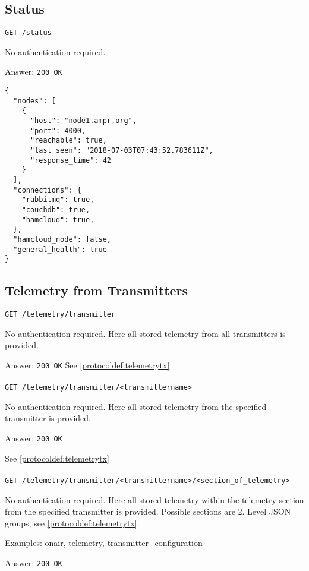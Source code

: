 
\subsection{Status}
\texttt{GET /status}

No authentication required.

Answer:
\texttt{200 OK}
\begin{lstlisting}
{
  "nodes": [
    {
      "host": "node1.ampr.org",
      "port": 4000,
      "reachable": true,
      "last_seen": "2018-07-03T07:43:52.783611Z",
      "response_time": 42
    }
  ],
  "connections": {
    "rabbitmq": true,
    "couchdb": true,
    "hamcloud": true,
  },
  "hamcloud_node": false,
  "general_health": true
}
\end{lstlisting}

\subsection{Telemetry from Transmitters}

\texttt{GET /telemetry/transmitter}

No authentication required. Here all stored telemetry from all transmitters is provided.

Answer:
\texttt{200 OK}
See \ref{protocoldef:telemetrytx}\\\\

\texttt{GET /telemetry/transmitter/<transmittername>}

No authentication required. Here all stored telemetry from the specified transmitter is provided.

Answer:
\texttt{200 OK}

See \ref{protocoldef:telemetrytx}\\\\

\texttt{GET /telemetry/transmitter/<transmittername>/<section\_of\_telemetry>}

No authentication required. Here all stored telemetry within the telemetry
section from the specified transmitter is provided. Possible sections are 2.
Level JSON groups, see \ref{protocoldef:telemetrytx}.

Examples: onair, telemetry, transmitter\_configuration

Answer:
\texttt{200 OK}

